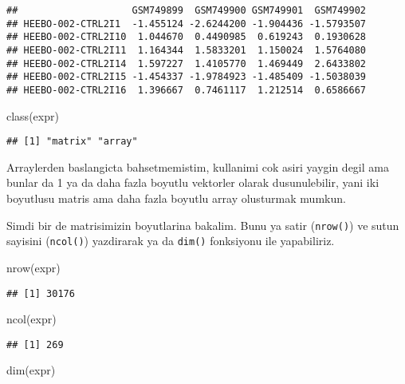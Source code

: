 \documentclass[
]{book}
\newenvironment{Shaded}{\begin{snugshade}}{\end{snugshade}}
\newcommand{\FunctionTok}[1]{\textcolor[rgb]{0.00,0.00,0.00}{#1}}
\newcommand{\NormalTok}[1]{#1}
\begin{document}
\begin{verbatim}
##                    GSM749899  GSM749900 GSM749901  GSM749902
## HEEBO-002-CTRL2I1  -1.455124 -2.6244200 -1.904436 -1.5793507
## HEEBO-002-CTRL2I10  1.044670  0.4490985  0.619243  0.1930628
## HEEBO-002-CTRL2I11  1.164344  1.5833201  1.150024  1.5764080
## HEEBO-002-CTRL2I14  1.597227  1.4105770  1.469449  2.6433802
## HEEBO-002-CTRL2I15 -1.454337 -1.9784923 -1.485409 -1.5038039
## HEEBO-002-CTRL2I16  1.396667  0.7461117  1.212514  0.6586667
\end{verbatim}

\begin{Shaded}
\begin{Highlighting}[]
\FunctionTok{class}\NormalTok{(expr)}
\end{Highlighting}
\end{Shaded}

\begin{verbatim}
## [1] "matrix" "array"
\end{verbatim}

Arraylerden baslangicta bahsetmemistim, kullanimi cok asiri yaygin degil ama bunlar da 1 ya da daha fazla boyutlu vektorler olarak dusunulebilir, yani iki boyutlusu matris ama daha fazla boyutlu array olusturmak mumkun.

Simdi bir de matrisimizin boyutlarina bakalim. Bunu ya satir (\texttt{nrow()}) ve sutun sayisini (\texttt{ncol()}) yazdirarak ya da \texttt{dim()} fonksiyonu ile yapabiliriz.

\begin{Shaded}
\begin{Highlighting}[]
\FunctionTok{nrow}\NormalTok{(expr)}
\end{Highlighting}
\end{Shaded}

\begin{verbatim}
## [1] 30176
\end{verbatim}

\begin{Shaded}
\begin{Highlighting}[]
\FunctionTok{ncol}\NormalTok{(expr)}
\end{Highlighting}
\end{Shaded}

\begin{verbatim}
## [1] 269
\end{verbatim}

\begin{Shaded}
\begin{Highlighting}[]
\FunctionTok{dim}\NormalTok{(expr)}
\end{Highlighting}
\end{Shaded}
\end{document}

